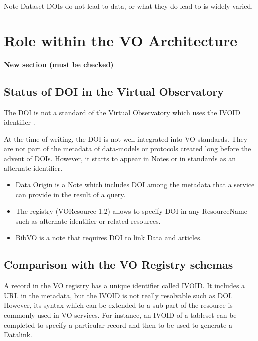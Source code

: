 \documentclass[11pt,a4paper]{ivoa}
\begin{document}
\begin{admonition}{Note}
Dataset DOIs do not lead to data, or what they do lead to is widely varied.
\end{admonition}

\section{Role within the VO Architecture}
\textbf{\color{red}New section (must be checked)}

\subsection{Status of DOI in the Virtual Observatory}
The DOI is not a standard of the Virtual Observatory which uses the IVOID identifier \citep{note:ivoid}.

At the time of writing, the DOI is not well integrated into VO standards. They are not part of the metadata of data-models or protocols created long before the advent of DOIs.
However, it starts to appear in Notes or in standards as an alternate identifier.


\begin {itemize}
\item Data Origin \citep{note:dataorigin} is a Note which includes DOI among the metadata that a service can provide in the result of a query.
\item The registry \citep{std:registry} (VOResource 1.2) allows to specify DOI in any ResourceName such as alternate identifier or related resources.
\item BibVO \citep{note:bibvo} is a note that requires DOI to link Data and articles.
\end{itemize}


\subsection{Comparison with the VO Registry schemas}
 A record in the VO registry has a unique identifier called IVOID. It includes a URL in the metadata, but the IVOID is not really resolvable such as DOI. However, its syntax which can be extended to a sub-part of the resource is commonly used in VO services. For instance, an IVOID of a tableset can be completed to specify a particular record and then to be used to generate a Datalink.
 
\end{document}
